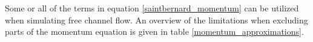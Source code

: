Some or all of the terms in equation \ref{saintbernard_momentum} can be utilized when simulating free channel flow. An overview of the limitations when excluding parts of the momentum equation is given in table \ref{momentum_approximations}.








